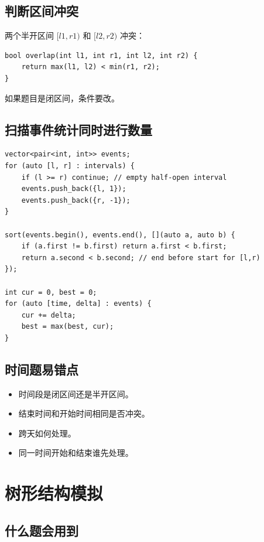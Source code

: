 \subsection{判断区间冲突}

两个半开区间 $[l1,r1)$ 和 $[l2,r2)$ 冲突：

\begin{lstlisting}
bool overlap(int l1, int r1, int l2, int r2) {
    return max(l1, l2) < min(r1, r2);
}
\end{lstlisting}

如果题目是闭区间，条件要改。

\subsection{扫描事件统计同时进行数量}

\begin{lstlisting}
vector<pair<int, int>> events;
for (auto [l, r] : intervals) {
    if (l >= r) continue; // empty half-open interval
    events.push_back({l, 1});
    events.push_back({r, -1});
}

sort(events.begin(), events.end(), [](auto a, auto b) {
    if (a.first != b.first) return a.first < b.first;
    return a.second < b.second; // end before start for [l,r)
});

int cur = 0, best = 0;
for (auto [time, delta] : events) {
    cur += delta;
    best = max(best, cur);
}
\end{lstlisting}

\subsection{时间题易错点}

\begin{itemize}
  \item 时间段是闭区间还是半开区间。
  \item 结束时间和开始时间相同是否冲突。
  \item 跨天如何处理。
  \item 同一时间开始和结束谁先处理。
\end{itemize}

\section{树形结构模拟}\label{sec:07-26}

\subsection{什么题会用到}

